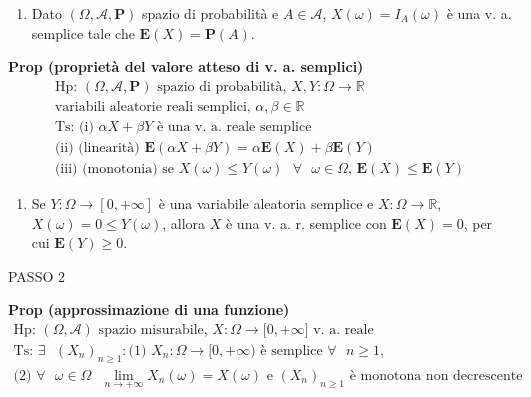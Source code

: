 \documentclass{article}
\begin{document}
\begin{enumerate}
\item Dato $\left( \Omega ,\mathcal{A},\mathbf{P}\right) $ spazio di
probabilit\`{a} e $A\in \mathcal{A}$, $X\left( \omega \right) =I_{A}\left(
\omega \right) $ \`{e} una v. a. semplice tale che $\mathbf{E}\left(
X\right) =\mathbf{P}\left( A\right) $.
\end{enumerate}

\textbf{Prop (propriet\`{a} del valore atteso di v. a. semplici)}%
\begin{gather*}
\text{Hp: }\left( \Omega ,\mathcal{A},\mathbf{P}\right) \text{ spazio di
probabilit\`{a}, }X,Y:\Omega \rightarrow 
\mathbb{R}
\text{ } \\
\text{variabili aleatorie reali semplici, }\alpha ,\beta \in 
\mathbb{R}
\\
\text{Ts: (i) }\alpha X+\beta Y\text{ \`{e} una v. a. reale semplice } \\
\text{(ii) (linearit\`{a}) }\mathbf{E}\left( \alpha X+\beta Y\right) =\alpha 
\mathbf{E}\left( X\right) +\beta \mathbf{E}\left( Y\right) \\
\text{(iii) (monotonia) se }X\left( \omega \right) \leq Y\left( \omega
\right) \text{ }\forall \text{ }\omega \in \Omega \text{, }\mathbf{E}\left(
X\right) \leq \mathbf{E}\left( Y\right)
\end{gather*}

\begin{enumerate}
\item Se $Y:\Omega \rightarrow \left[ 0,+\infty \right] $ \`{e} una
variabile aleatoria semplice e $X:\Omega \rightarrow 
\mathbb{R}
$, $X\left( \omega \right) =0\leq Y\left( \omega \right) $, allora $X$ \`{e}
una v. a. r. semplice con $\mathbf{E}\left( X\right) =0$, per cui $\mathbf{E}%
\left( Y\right) \geq 0$.
\end{enumerate}

PASSO 2

\textbf{Prop (approssimazione di una funzione)}%
\begin{gather*}
\text{Hp: }\left( \Omega ,\mathcal{A}\right) \text{ spazio misurabile, }%
X:\Omega \rightarrow \lbrack 0,+\infty ]\text{ v. a. reale} \\
\text{Ts: }\exists \text{ }\left( X_{n}\right) _{n\geq 1}:\text{(1) }%
X_{n}:\Omega \rightarrow \lbrack 0,+\infty )\text{ \`{e} semplice }\forall 
\text{ }n\geq 1\text{,} \\
\text{(2) }\forall \text{ }\omega \in \Omega \text{ }\lim_{n\rightarrow
+\infty }X_{n}\left( \omega \right) =X\left( \omega \right) \text{ e }\left(
X_{n}\right) _{n\geq 1}\text{ \`{e} monotona non decrescente}
\end{gather*}
\end{document}
